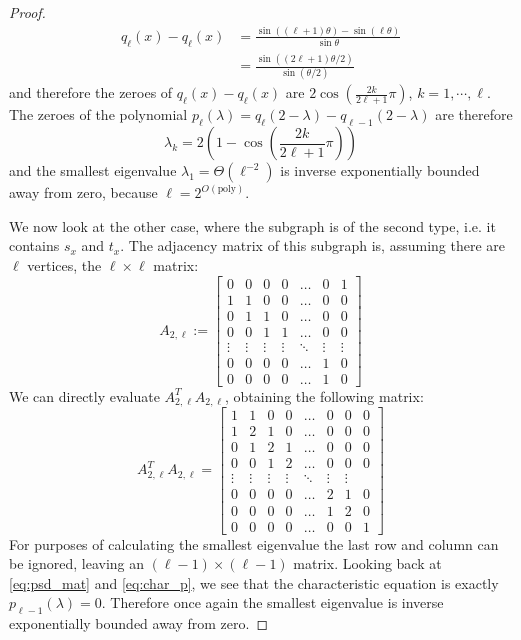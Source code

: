 \documentclass[11pt]{article}
\theoremstyle{definition}
\theoremstyle{remark}
\newcommand{\poly}{\textrm{poly}}
\begin{document}
\begin{proof}
\begin{align}
q_\ell(x) - q_{\ell}(x) &= \frac{\sin((\ell+1)\theta) - \sin(\ell \theta)}{\sin\theta} \\
&= \frac{\sin((2\ell+1)\theta/2)}{\sin (\theta/2)}
\end{align}
and therefore the zeroes of $q_\ell(x) - q_{\ell}(x)$ are $2\cos\left(\frac{2k}{2\ell + 1}\pi\right)$, $k = 1,\cdots,\ell$. The zeroes of the polynomial $p_\ell(\lambda) = q_\ell(2-\lambda) - q_{\ell-1}(2-\lambda)$ are therefore 
\begin{equation}
\lambda_k = 2\left(1 - \cos\left(\frac{2k}{2\ell+1}\pi\right)\right)
\end{equation}
and the smallest eigenvalue $\lambda_1 = \Theta(\ell^{-2})$ is inverse exponentially bounded away from zero, because $\ell = 2^{O(\poly)}$.

We now look at the other case, where the subgraph is of the second type, i.e. it contains $s_x$ and $t_x$. The adjacency matrix of this subgraph is, assuming there are $\ell$ vertices, the $\ell \times \ell $ matrix:
\begin{equation}
A_{2,\ell} := 
\begin{bmatrix}
    0 & 0 & 0 & 0 & \dots  & 0  & 1 \\
    1 & 1 & 0 & 0 &\dots  & 0 & 0 \\
    0 & 1 & 1 & 0 & \dots  & 0 & 0 \\
     0 & 0 & 1 & 1 & \dots  & 0 & 0 \\
    \vdots & \vdots & \vdots & \vdots & \ddots & \vdots & \vdots \\
    0 & 0 & 0 & 0 & \dots  & 1 & 0 \\
    0 & 0 & 0 & 0 & \dots  & 1 & 0
\end{bmatrix}
\end{equation}
We can directly evaluate $A_{2,\ell}^T A_{2,\ell}$, obtaining the following matrix:
\begin{equation}
A_{2,\ell}^T A_{2,\ell} = 
\begin{bmatrix}
    1 & 1 & 0 & 0 & \dots  & 0 & 0  & 0 \\
    1 & 2 & 1 & 0 &\dots  & 0 & 0 & 0 \\
    0 & 1 & 2 & 1 & \dots  & 0 & 0 & 0 \\
     0 & 0 & 1 & 2 & \dots  & 0 & 0 & 0 \\
    \vdots & \vdots & \vdots & \vdots & \ddots & \vdots & \vdots \\
    0 & 0 & 0 & 0 & \dots  & 2 & 1 & 0 \\
    0 & 0 & 0 & 0 & \dots  & 1 & 2 & 0 \\
    0 & 0 & 0 & 0 & \dots  & 0 & 0 & 1
\end{bmatrix}
\end{equation}
For purposes of calculating the smallest eigenvalue the last row and column can be ignored, leaving an $(\ell-1) \times (\ell-1)$ matrix. Looking back at \ref{eq:psd_mat} and \ref{eq:char_p}, we see that the characteristic equation is exactly $p_{\ell-1}(\lambda) = 0$. Therefore once again the smallest eigenvalue is inverse exponentially bounded away from zero.

\end{proof}
\end{document}
